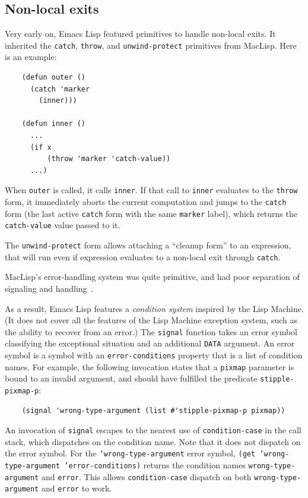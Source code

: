 \documentclass[format=acmsmall, review]{acmart}
\newcommand \Elisp {Emacs Lisp}
\begin{document}
\subsection{Non-local exits}
\label{sec:non-local-exits}

Very early on, \Elisp{} featured primitives to handle
non-local exits.  It inherited the \texttt{catch}, \texttt{throw}, and
\texttt{unwind-protect} primitives from MacLisp.  Here is an example:
%
\begin{verbatim}
    (defun outer ()
      (catch 'marker
        (inner)))
    
    (defun inner ()
      ...
      (if x
          (throw 'marker 'catch-value))
      ...)
\end{verbatim}
%
When \texttt{outer} is called, it calls \texttt{inner}.  If that call
to \texttt{inner} evaluates to the \texttt{throw} form, it immediately
aborts the current computation and jumps to the \texttt{catch} form
(the last active \texttt{catch} form with the same \texttt{marker}
label), which returns the \texttt{catch-value} value passed to it.

The \texttt{unwind-protect} form allows attaching a ``cleanup form''
to an expression, that will run even if expression evaluates to a
non-local exit through \texttt{catch}.

MacLisp's error-handling system was quite primitive, and had poor separation
of signaling and handling~\cite{Pitman2001}.

As a result, \Elisp{} features
a \emph{condition system} inspired by the Lisp Machine.  (It does
not cover all the features of the Lisp Machine exception system, such as the ability
to recover from an error.)
The \texttt{signal} function takes an error symbol classifying the
exceptional situation and an additional \texttt{DATA} argument.  An error
symbol is a symbol with an \texttt{error-conditions} property that is a list
of condition names.  For example, the following invocation states that
a \texttt{pixmap} parameter is bound to an invalid argument, and
should have fulfilled the predicate \texttt{stipple-pixmap-p}:
\begin{verbatim}
    (signal 'wrong-type-argument (list #'stipple-pixmap-p pixmap))
\end{verbatim}
An invocation of \texttt{signal} escapes to the nearest use of
\texttt{condition-case} in the call stack, which dispatches on the
condition name.  Note that it does not dispatch on the error symbol.
For the \texttt{'wrong-type-argument} error symbol, \texttt{(get
  'wrong-type-argument 'error-conditions)} returns the condition names
\texttt{wrong-type-argument} and \texttt{error}.  This allows
\texttt{condition-case} dispatch on both \texttt{wrong-type-argument}
and \texttt{error} to work.
\end{document}
